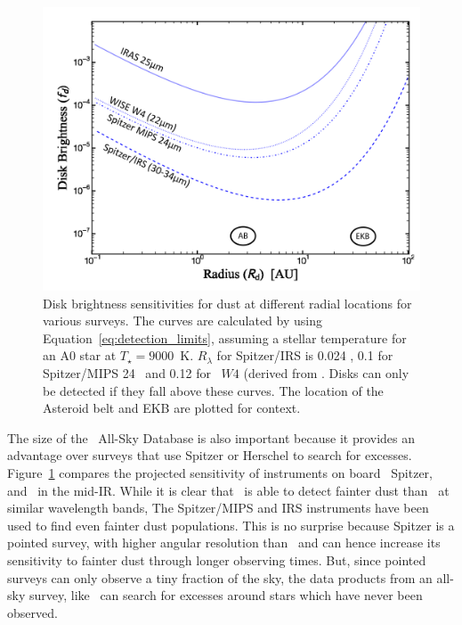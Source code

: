     
    \begin{figure}
    \centering
    \includegraphics[scale=0.5]{Ch2/fdd_vs_tbb}
    \caption[Survey disk detection limits]{Disk brightness sensitivities for dust at different radial locations for various surveys. The curves are calculated by using Equation~\ref{eq:detection_limits}, assuming a stellar temperature for an A0 star at $T_\star=9000$~K. $R_\lambda$ for Spitzer/IRS is 0.024 \citep{Chen2006}, 0.1 for Spitzer/MIPS 24\micron\ \citep{Rieke2005} and 0.12 for \WS\ $W4$ (derived from \citep{Patel2014}. Disks can only be detected if they fall above these curves. The location of the Asteroid belt and EKB are plotted for context.}
    \label{fig:sensitivity_all}
    \end{figure}

    
    
    The size of the \WS\ All-Sky Database is also important because it provides an advantage over surveys that use Spitzer or Herschel to search for excesses. Figure~\ref{fig:sensitivity_all} compares the projected sensitivity of instruments on board \WS\, Spitzer, and \iras\ in the mid-IR. While it is clear that \WS\ is able to detect fainter dust than \iras\ at similar wavelength bands, The Spitzer/MIPS and IRS instruments have been used to find even fainter dust populations. This is no surprise because Spitzer is a pointed survey, with higher angular resolution than \WS\, and can hence increase its sensitivity to fainter dust through longer observing times. But, since pointed surveys can only observe a tiny fraction of the sky, the data products from an all-sky survey, like \WS\, can search for excesses around stars which have never been observed. 
    
